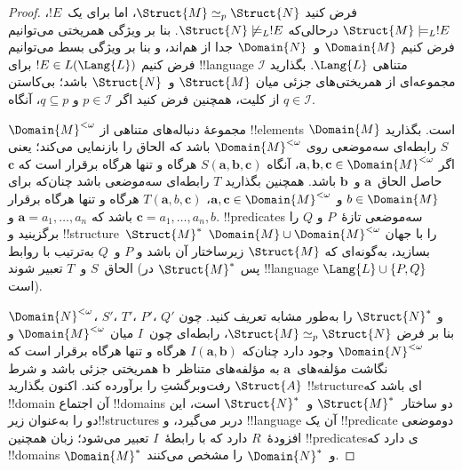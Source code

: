 \documentclass[../../../include/open-logic-section]{subfiles}
\begin{document}
\begin{proof}
فرض کنید $\Struct{M} \simeq_p \Struct{N}$، اما برای یک~$!E$،
$\Struct{M} \models_L !E$ درحالی‌که
$\Struct{N} \not\models_L !E$. بنا بر ویژگی همریختی می‌توانیم فرض کنیم
$\Domain{M}$ و~$\Domain{N}$ جدا از هم‌اند، و بنا بر ویژگی بسط
می‌توانیم فرض کنیم $!E \in L(\Lang{L})$ برای !!{language} متناهی
$\Lang{L}$. بگذارید $\mathcal{I}$ مجموعه‌ای از همریختی‌های جزئی میان
$\Struct{M}$ و~$\Struct{N}$ باشد؛ بی‌کاستن از کلیت، همچنین فرض کنید
اگر $p \in \mathcal{I}$ و $q \subseteq p$، آنگاه
$q \in \mathcal{I}$.

$\Domain{M}^{<\omega}$ مجموعهٔ دنباله‌های متناهی از !!{element}s
$\Domain{M}$ است. بگذارید $S$ رابطه‌ای سه‌موضعی روی
$\Domain{M}^{<\omega}$ باشد که الحاق را بازنمایی می‌کند؛ یعنی اگر
$\mathbf{a}, \mathbf{b}, \mathbf{c} \in \Domain{M}^{<\omega}$،
آنگاه $S(\mathbf{a}, \mathbf{b}, \mathbf{c})$ هرگاه و تنها هرگاه
برقرار است که $\mathbf{c}$ حاصل الحاق~$\mathbf{a}$ و~$\mathbf{b}$
باشد. همچنین بگذارید $T$ رابطه‌ای سه‌موضعی باشد چنان‌که برای
$b \in \Domain{M}$ و
$\mathbf{a}, \mathbf{c} \in \Domain{M}^{<\omega}$،
$T(\mathbf{a}, b, \mathbf{c})$ هرگاه و تنها هرگاه برقرار باشد که
$\mathbf{a}=a_1,\dots,a_n$ و
$\mathbf{c}=a_1,\dots,a_n,b$. !!{predicate}s سه‌موضعی تازهٔ~$P$ و
$Q$ را برگزینید و !!{structure}~$\Struct{M}^*$ را با جهان
$\Domain{M} \cup \Domain{M}^{<\omega}$ بسازید، به‌گونه‌ای که
$\Struct{M}$ زیرساختار آن باشد و $P$ و~$Q$ به‌ترتیب با روابط
الحاق~$S$ و~$T$ تعبیر شوند (پس $\Struct{M}^*$ در !!{language}
$\Lang{L} \cup \{P,Q\}$ است).

$\Domain{N}^{<\omega}$، $S'$، $T'$، $P'$، $Q'$ و
$\Struct{N}^*$ را به‌طور مشابه تعریف کنید. چون بنا بر فرض
$\Struct{M} \simeq_p \Struct{N}$، رابطه‌ای چون~$I$ میان
$\Domain{M}^{<\omega}$ و $\Domain{N}^{<\omega}$ وجود دارد چنان‌که
$I(\mathbf{a},\mathbf{b})$ هرگاه و تنها هرگاه برقرار است که نگاشت
مؤلفه‌های~$\mathbf{a}$ به مؤلفه‌های متناظر~$\mathbf{b}$ همریختی جزئی
باشد و شرط رفت‌وبرگشتِ
 را برآورده کند. اکنون بگذارید
$\Struct{A}$ !!{structure}ای باشد که !!{domain} آن اجتماع
!!{domain}s دو ساختار~$\Struct{M}^*$ و~$\Struct{N}^*$ است، این دو را
به‌عنوان زیر!!{structure}s دربر می‌گیرد، و !!{language} آن یک !!{predicate}
دوموضعی افزودهٔ~$R$ دارد که با رابطهٔ~$I$ تعبیر می‌شود؛ زبان همچنین
!!{predicate}sی دارد که !!{domain}s
$\Domain{M}^*$ و~$\Domain{N}^*$ را مشخص می‌کنند.


\end{proof}
\end{document}

